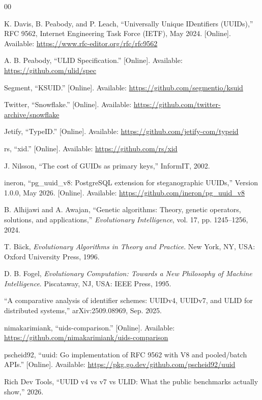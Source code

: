 \documentclass[conference]{IEEEtran}
\begin{document}
\begin{thebibliography}{00}

K. Davis, B. Peabody, and P. Leach, ``Universally Unique IDentifiers (UUIDs),'' RFC 9562, Internet Engineering Task Force (IETF), May 2024. [Online]. Available: \url{https://www.rfc-editor.org/rfc/rfc9562}

A. B. Peabody, ``ULID Specification.'' [Online]. Available: \url{https://github.com/ulid/spec}

Segment, ``KSUID.'' [Online]. Available: \url{https://github.com/segmentio/ksuid}

Twitter, ``Snowflake.'' [Online]. Available: \url{https://github.com/twitter-archive/snowflake}

Jetify, ``TypeID.'' [Online]. Available: \url{https://github.com/jetify-com/typeid}

rs, ``xid.'' [Online]. Available: \url{https://github.com/rs/xid}

J. Nilsson, ``The cost of GUIDs as primary keys,'' InformIT, 2002.

ineron, ``pg\_uuid\_v8: PostgreSQL extension for steganographic UUIDs,'' Version 1.0.0, May 2026. [Online]. Available: \url{https://github.com/ineron/pg_uuid_v8}

B. Alhijawi and A. Awajan, ``Genetic algorithms: Theory, genetic operators, solutions, and applications,'' \emph{Evolutionary Intelligence}, vol. 17, pp. 1245--1256, 2024.

T. Bäck, \emph{Evolutionary Algorithms in Theory and Practice}. New York, NY, USA: Oxford University Press, 1996.

D. B. Fogel, \emph{Evolutionary Computation: Towards a New Philosophy of Machine Intelligence}. Piscataway, NJ, USA: IEEE Press, 1995.

``A comparative analysis of identifier schemes: UUIDv4, UUIDv7, and ULID for distributed systems,'' arXiv:2509.08969, Sep. 2025.

nimakarimiank, ``uids-comparison.'' [Online]. Available: \url{https://github.com/nimakarimiank/uids-comparison}

pscheid92, ``uuid: Go implementation of RFC 9562 with V8 and pooled/batch APIs.'' [Online]. Available: \url{https://pkg.go.dev/github.com/pscheid92/uuid}

Rich Dev Tools, ``UUID v4 vs v7 vs ULID: What the public benchmarks actually show,'' 2026.


\end{thebibliography}
\end{document}
